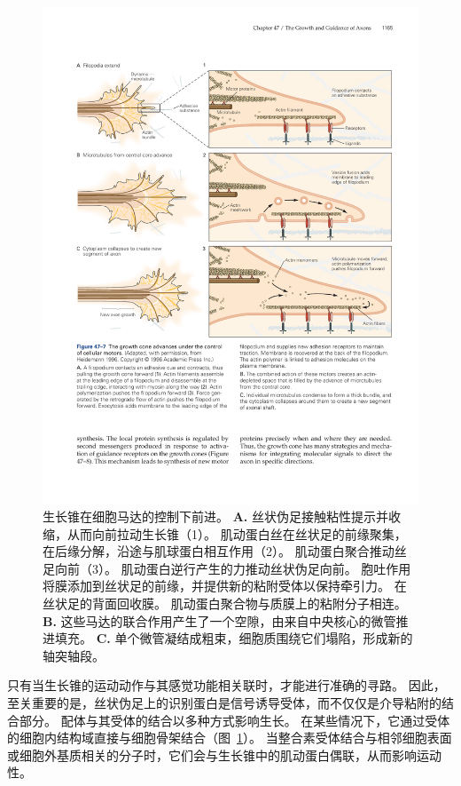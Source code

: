 \begin{figure}[htbp]
	\centering
	\includegraphics[width=1.0\linewidth]{chap47/fig_47_7}
	\caption{生长锥在细胞马达的控制下前进\cite{heidemann1996cytoplasmic}。
		\textbf{A.} 丝状伪足接触粘性提示并收缩，从而向前拉动生长锥（1）。
		肌动蛋白丝在丝状足的前缘聚集，在后缘分解，沿途与肌球蛋白相互作用（2）。
		肌动蛋白聚合推动丝足向前（3）。
		肌动蛋白逆行产生的力推动丝状伪足向前。
		胞吐作用将膜添加到丝状足的前缘，并提供新的粘附受体以保持牵引力。
		在丝状足的背面回收膜。
		肌动蛋白聚合物与质膜上的粘附分子相连。
		\textbf{B.} 这些马达的联合作用产生了一个空隙，由来自中央核心的微管推进填充。
		\textbf{C.} 单个微管凝结成粗束，细胞质围绕它们塌陷，形成新的轴突轴段。}
	\label{fig:47_7}
\end{figure}


只有当生长锥的运动动作与其感觉功能相关联时，才能进行准确的寻路。
因此，至关重要的是，丝状伪足上的识别蛋白是信号诱导受体，而不仅仅是介导粘附的结合部分。
配体与其受体的结合以多种方式影响生长。
在某些情况下，它通过受体的细胞内结构域直接与细胞骨架结合（图~\ref{fig:47_7}）。
当整合素受体结合与相邻细胞表面或细胞外基质相关的分子时，它们会与生长锥中的肌动蛋白偶联，从而影响运动性。


